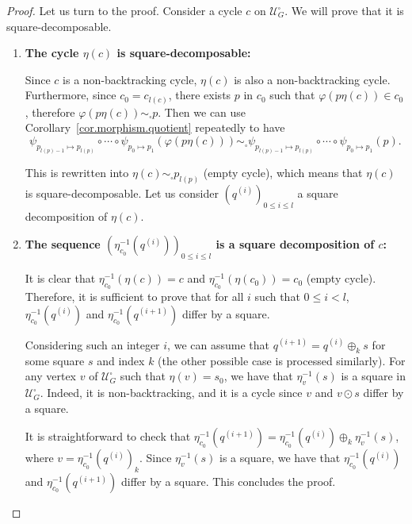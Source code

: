 \documentclass[10pt,a4paper]{amsart}
\newcommand\quadcover[1]{\mathcal{U}^\square_{#1}}
\begin{document}
\begin{proof}
Let us turn to the proof. Consider a cycle $c$ on $\quadcover{G}$. We will prove that it is square-decomposable.
\begin{enumerate}
\item \textbf{The cycle $\eta(c)$ is square-decomposable:}

Since $c$ is a non-backtracking cycle, $\eta(c)$ is also a non-backtracking cycle. 
Furthermore, since $c_0 = c_{l(c)}$, there exists $p$ in $c_0$ such that $\varphi(p \eta(c)) \in c_0$, therefore 
$\varphi(p \eta(c)) \sim_{\square} p$.
Then we can use Corollary~\ref{cor.morphism.quotient} repeatedly to have 
\[\psi_{p_{l(p)-1} \mapsto p_{l(p)}} \circ \cdots \circ \psi_{p_0 \mapsto p_1} (\varphi(p \eta(c))) \sim_{\square} \psi_{p_{l(p)-1} \mapsto p_{l(p)}} \circ \cdots \circ \psi_{p_0 \mapsto p_1} (p).\]

This is rewritten into $\eta(c) \sim_{\square} p_{l(p)}$ (empty cycle), which means that $\eta(c)$ is square-decomposable. Let us consider $(q^{(i)})_{0\le i\le l}$ a square decomposition of $\eta(c)$.

\item \textbf{The sequence $(\eta^{-1}_{c_0}(q^{(i)}))_{0\le i\le l}$ is a square decomposition of $c$:} 

It is clear that $\eta^{-1}_{c_0}(\eta(c)) = c$ and $\eta^{-1}_{c_0}(\eta(c_0)) = c_0$ (empty cycle). Therefore, it is sufficient to prove that for all $i$ such that $0\leq i < l$, $\eta^{-1}_{c_0}(q^{(i)})$ and $\eta^{-1}_{c_0}(q^{(i+1)})$ differ by a square.

Considering such an integer $i$, we can assume that $q^{(i+1)} = q^{(i)} \oplus_k s$ for some square $s$ and index $k$ (the other possible case is processed similarly). For any vertex $v$ of $\quadcover{G}$ such that $\eta(v) = s_0$, we have that $\eta^{-1}_{v}(s)$ is a square in $\quadcover{G}$. Indeed, it is non-backtracking, and it is a cycle since $v$ and $v\odot s$ differ by a square.

It is straightforward to check that $\eta^{-1}_{c_0}(q^{(i+1)}) = \eta^{-1}_{c_0}(q^{(i)}) \oplus_k \eta^{-1}_{v}(s)$, where $v =  \eta^{-1}_{c_0}(q^{(i)})_k$. Since $\eta^{-1}_{v}(s)$ is a square, we have that $\eta^{-1}_{c_0}(q^{(i)})$ and $\eta^{-1}_{c_0}(q^{(i+1)})$ differ by a square. This concludes the proof.\qedhere
\end{enumerate}
\end{proof}
\end{document}
